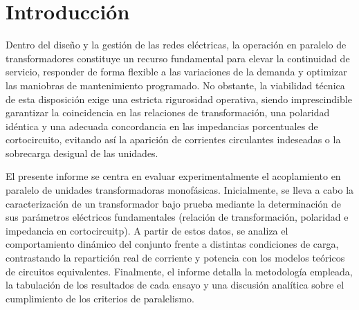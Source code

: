 \section{Introducción}

Dentro del diseño y la gestión de las redes eléctricas, la operación en paralelo de transformadores constituye un recurso fundamental para elevar la continuidad de servicio, responder de forma flexible a las variaciones de la demanda y optimizar las maniobras de mantenimiento programado. No obstante, la viabilidad técnica de esta disposición exige una estricta rigurosidad operativa, siendo imprescindible garantizar la coincidencia en las relaciones de transformación, una polaridad idéntica y una adecuada concordancia en las impedancias porcentuales de cortocircuito, evitando así la aparición de corrientes circulantes indeseadas o la sobrecarga desigual de las unidades.

El presente informe se centra en evaluar experimentalmente el acoplamiento en paralelo de unidades transformadoras monofásicas. Inicialmente, se lleva a cabo la caracterización de un transformador bajo prueba mediante la determinación de sus parámetros eléctricos fundamentales (relación de transformación, polaridad e impedancia en cortocircuitp). A partir de estos datos, se analiza el comportamiento dinámico del conjunto frente a distintas condiciones de carga, contrastando la repartición real de corriente y potencia con los modelos teóricos de circuitos equivalentes. Finalmente, el informe detalla la metodología empleada, la tabulación de los resultados de cada ensayo y una discusión analítica sobre el cumplimiento de los criterios de paralelismo.